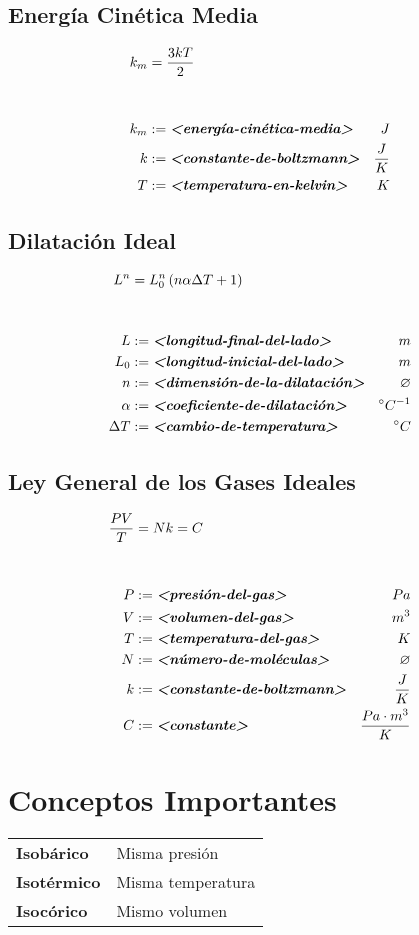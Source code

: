 \documentclass{article}
\begin{document}
\subsection*{Energía Cinética Media}

\begin{align*}
    k_m     &= \frac{3kT}{2} \\[1cm]
    k_m     &:= \textit{\textbf{<energía-cinética-media>}}  &J \\
    k       &:= \textit{\textbf{<constante-de-boltzmann>}}  &\frac{J}{K} \\
    T       &:= \textit{\textbf{<temperatura-en-kelvin>}}   &K
\end{align*}

\subsection*{Dilatación Ideal}

\begin{align*}
    L^n         &= L_0^n \left( n \alpha \Delta T + 1 \right) \\[1cm]
    L           &:= \textit{\textbf{<longitud-final-del-lado>}}     &m \\
    L_0         &:= \textit{\textbf{<longitud-inicial-del-lado>}}   &m \\
    n           &:= \textit{\textbf{<dimensión-de-la-dilatación>}}  &\varnothing \\
    \alpha      &:= \textit{\textbf{<coeficiente-de-dilatación>}}   &^\circ C^{-1} \\
    \Delta T    &:= \textit{\textbf{<cambio-de-temperatura>}}       &^\circ C
\end{align*}

\subsection*{Ley General de los Gases Ideales}

\begin{align*}
    \frac{PV}{T} &= Nk = C \\[1cm]
    P       &:= \textit{\textbf{<presión-del-gas>}}         &Pa \\
    V       &:= \textit{\textbf{<volumen-del-gas>}}         &m^3 \\
    T       &:= \textit{\textbf{<temperatura-del-gas>}}     &K \\
    N       &:= \textit{\textbf{<número-de-moléculas>}}     &\varnothing \\
    k       &:= \textit{\textbf{<constante-de-boltzmann>}}  &\frac{J}{K} \\
    C       &:= \textit{\textbf{<constante>}}               &\frac{Pa \cdot m^3}{K}
\end{align*}

\section*{Conceptos Importantes}

\begin{tabular}{m{3cm} l}
    \textbf{Isobárico} & Misma presión \\
    \textbf{Isotérmico} & Misma temperatura \\
    \textbf{Isocórico} & Mismo volumen \\
\end{tabular}
\end{document}
